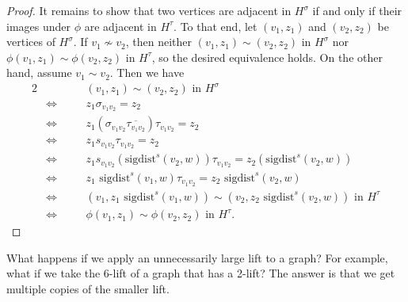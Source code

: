 \documentclass[12pt]{article}
\theoremstyle{definition}
\begin{document}
\begin{proof}
It remains to show that two vertices are adjacent in $H^\sigma$ if and only if their images under $\phi$ are adjacent in $H^\tau$. To that end, let $(v_1, z_1)$ and $(v_2, z_2)$ be vertices of $H^\sigma$. If $v_1 \not\sim v_2$, then neither $(v_1, z_1) \sim (v_2, z_2) \text{ in } H^\sigma$ nor $\phi(v_1, z_1) \sim \phi(v_2, z_2) \text{ in } H^\tau$, so the desired equivalence holds. On the other hand, assume $v_1 \sim v_2$. Then we have 
\begin{alignat*}{2}
& & &(v_1, z_1) \sim (v_2, z_2) \text{ in } H^\sigma \\
&\iff\quad & &z_1 \sigma_{v_1 v_2} = z_2 \\
&\iff & &z_1 (\sigma_{v_1 v_2} \overline{\tau_{v_1 v_2}}) \tau_{v_1 v_2} = z_2 \\
&\iff & &z_1 s_{v_1 v_2} \tau_{v_1 v_2} = z_2 \\
&\iff & &z_1 s_{v_1 v_2} \left( \text{sigdist}^s (v_2, w) \right) \tau_{v_1 v_2} = z_2 \left( \text{sigdist}^s (v_2, w) \right) \\
&\iff & &z_1 \text{ sigdist}^s (v_1, w) \tau_{v_1 v_2} = z_2 \text{ sigdist}^s (v_2, w) \\
&\iff & &(v_1, z_1 \text{ sigdist}^s (v_1, w)) \sim (v_2, z_2 \text{ sigdist}^s (v_2, w)) \text{ in } H^\tau \\
&\iff & &\phi(v_1, z_1) \sim \phi(v_2, z_2) \text{ in } H^\tau.
\end{alignat*}
\end{proof}

What happens if we apply an unnecessarily large lift to a graph? For example, what if we take the 6-lift of a graph that has a 2-lift? The answer is that we get multiple copies of the smaller lift.
\end{document}
